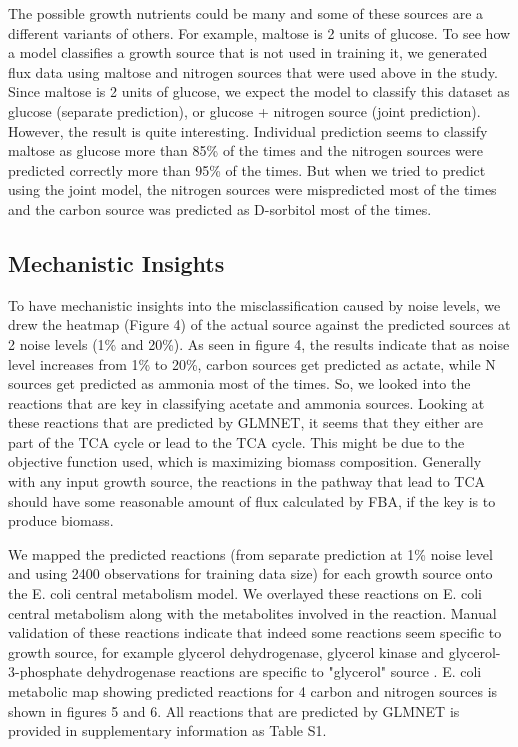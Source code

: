 \documentclass[12pt]{article}
\begin{document}
\bigskip
\noindent
The possible growth nutrients could be many and some of these sources are a different variants of others. For example, maltose is 2 units of glucose. To see how a model classifies a growth source that is not used in training it, we generated flux data using maltose and nitrogen sources that were used above in the study. Since maltose is 2 units of glucose, we expect the model to classify this dataset as glucose (separate prediction), or glucose + nitrogen source (joint prediction). However, the result is quite interesting. Individual prediction seems to classify maltose as glucose more than 85\% of the times and the nitrogen sources were predicted correctly more than 95\% of the times. But when we tried to predict using the joint model, the nitrogen sources were mispredicted most of the times and the carbon source was predicted as D-sorbitol most of the times. 

\subsection*{Mechanistic Insights}
\bigskip
\noindent
To have mechanistic insights into the misclassification caused by noise levels, we drew the heatmap (Figure 4) of the actual source against the predicted sources at 2 noise levels (1\% and 20\%). As seen in figure 4, the results indicate that as noise level increases from 1\% to 20\%, carbon sources get predicted as actate, while N sources get predicted as ammonia most of the times. So, we looked into the reactions that are key in classifying acetate and ammonia sources. Looking at these reactions that are predicted by GLMNET, it seems that they either are part of the TCA cycle or lead to the TCA cycle. This might be due to the objective function used, which is maximizing biomass composition. Generally with any input growth source, the reactions in the pathway that lead to TCA should have some reasonable amount of flux calculated by FBA, if the key is to produce biomass.

\bigskip
\noindent
We mapped the predicted reactions (from separate prediction at 1\% noise level and using 2400 observations for training data size) for each growth source onto the E. coli central metabolism model. We overlayed these reactions on E. coli central metabolism along with the metabolites involved in the reaction. Manual validation of these reactions indicate that indeed some reactions seem specific to growth source, for example glycerol dehydrogenase, glycerol kinase and glycerol-3-phosphate dehydrogenase reactions are specific to "glycerol" source \cite{ZZZZ}. E. coli metabolic map showing predicted reactions for 4 carbon and nitrogen sources is shown in figures 5 and 6. All reactions that are predicted by GLMNET is provided in supplementary information as Table S1.
\end{document}
